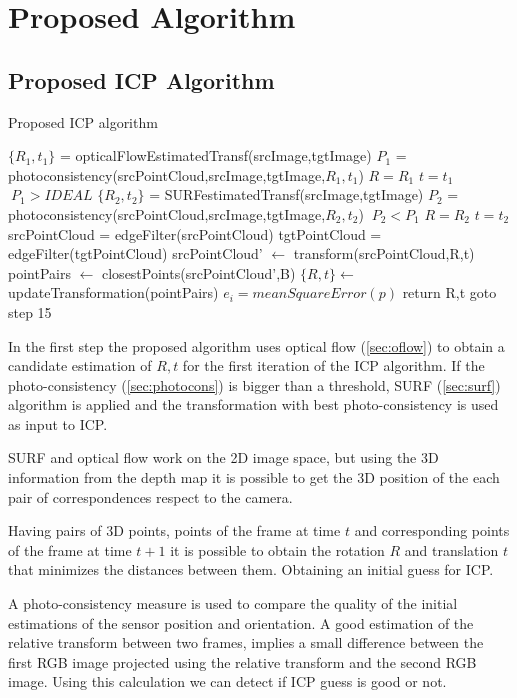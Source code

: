 \section{Proposed Algorithm}

\subsection{Proposed ICP Algorithm}

\begin{algorithm}
\caption{Proposed ICP algorithm}
\begin{algorithmic}[1]
\State $\{R_1,t_1\}$ = opticalFlowEstimatedTransf(srcImage,tgtImage)
\State $P_1$ = photoconsistency(srcPointCloud,srcImage,tgtImage,$R_1,t_1$)
\State $R=R_1$
\State $t=t_1$
\If $\ P_1 > IDEAL$
    \State $\{R_2,t_2\}$ = SURFestimatedTransf(srcImage,tgtImage)
    \State  $P_2$ = photoconsistency(srcPointCloud,srcImage,tgtImage,$R_2,t_2$)
    \If $\ P_2 < P_1$
        \State $R=R_2$
        \State $t=t_2$
    \EndIf
\EndIf
\State srcPointCloud = edgeFilter(srcPointCloud)
\State tgtPointCloud = edgeFilter(tgtPointCloud)
\State srcPointCloud' $\leftarrow$ transform(srcPointCloud,R,t) 
\State pointPairs $\leftarrow$ closestPoints(srcPointCloud',B)
\State $\{R,t\} \gets$ updateTransformation(pointPairs)
\State $e_i = meanSquareError(p)$
	\State return R,t
\Else
	\State goto step 15
\EndIf
\end{algorithmic}
\end{algorithm}


In the first step the proposed algorithm uses optical flow (\ref{sec:oflow}) to obtain a candidate estimation of 
$R,t$ for the first iteration of the ICP algorithm. If the photo-consistency (\ref{sec:photocons}) is bigger than a threshold, 
SURF (\ref{sec:surf}) algorithm is applied and the transformation with best photo-consistency is used as input to ICP.

SURF and optical flow work on the 2D image space, but using 
the 3D information from the depth map it is possible to get the 3D position 
of the each pair of correspondences respect to the camera. 

Having pairs of 3D points, points of the frame at time $t$ and corresponding points 
of the frame at time $t + 1$ it is possible to obtain the rotation $R$ and translation $t$
 that minimizes the distances between them. Obtaining an initial guess 
 for ICP. 

A photo-consistency measure is used to compare the quality of the initial estimations of the sensor
 position and orientation. A good estimation of the relative transform between two frames, implies 
a small difference between the first RGB image projected using the relative transform and the second RGB 
image. Using this calculation we can detect if ICP guess is good or not.

